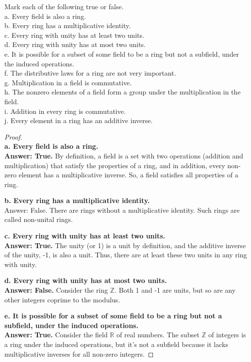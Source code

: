 \documentclass[12pt]{amsart}
\theoremstyle{definition}
\numberwithin{equation}{section}
\theoremstyle{plain}
\newcommand{\Z}{\mathbb{Z}}
\begin{document}
\begin{exercise}{33} 
    Mark each of the following true or false.\\
a. Every field is also a ring.\\
b. Every ring has a multiplicative identity.\\
c. Every ring with unity has at least two units.\\
d. Every ring with unity has at most two units.\\
e. It is possible for a subset of some field to be a ring but not a subfield, under the induced operations.\\
f. The distributive laws for a ring are not very important.\\
g. Multiplication in a field is commutative.\\
h. The nonzero elements of a field form a group under the multiplication in the field.\\
i. Addition in every ring is commutative.\\
j. Every element in a ring has an additive inverse.\\



\begin{proof} $ $ \\

\textbf{a. Every field is also a ring.} \\
\textbf{Answer: True.} By definition, a field is a set with two operations (addition and multiplication) that satisfy the properties of a ring, and in addition, every non-zero element has a multiplicative inverse. So, a field satisfies all properties of a ring.

\textbf{b. Every ring has a multiplicative identity.} \\
Answer: False. There are rings without a multiplicative identity. Such rings are called non-unital rings.

\textbf{c. Every ring with unity has at least two units.} \\
\textbf{Answer: True.} The unity (or 1) is a unit by definition, and the additive inverse of the unity, -1, is also a unit. Thus, there are at least these two units in any ring with unity.

\textbf{d. Every ring with unity has at most two units.} \\
\textbf{Answer: False.} Consider the ring \( \Z \). Both 1 and -1 are units, but so are any other integers coprime to the modulus.

\textbf{e. It is possible for a subset of some field to be a ring but not a subfield, under the induced operations.} \\
\textbf{Answer: True.} Consider the field \( \mathbb{R} \) of real numbers. The subset \( \Z \) of integers is a ring under the induced operations, but it's not a subfield because it lacks multiplicative inverses for all non-zero integers.


\end{proof}
\end{exercise}
\end{document}
